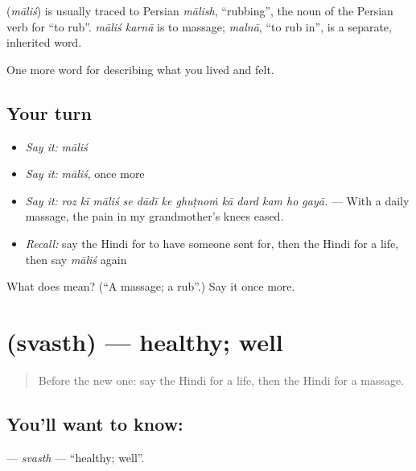 \begin{cousinweb}
\textbf{} (\emph{māliś}) is usually traced to Persian \emph{mālish}, \textquotedblleft{}rubbing\textquotedblright{}, the noun of the Persian verb for \textquotedblleft{}to rub\textquotedblright{}. \emph{māliś karnā} is to massage; \emph{malnā}, \textquotedblleft{}to rub in\textquotedblright{}, is a separate, inherited word.
\end{cousinweb}

\begin{grammarlens}[title={What you've built}]
One more word for describing what you lived and felt.
\end{grammarlens}

\subsection*{Your turn}
\begin{itemize}
\raggedright
  \item \emph{Say it:} \emph{māliś}
  \item \emph{Say it:} \emph{māliś}, once more
  \item \emph{Say it:} \emph{roz kī māliś se dādī ke ghuṭnoṁ kā dard kam ho gayā.} — With a daily massage, the pain in my grandmother's knees eased.
  \item \emph{Recall:} say the Hindi for to have someone sent for, then the Hindi for a life, then say \emph{māliś} again
\end{itemize}

\begin{tcolorbox}[breakable,colback=teal!4,colframe=teal!35!black,title={Before you move on}]
What does  mean? (\textquotedblleft{}A massage; a rub\textquotedblright{}.) Say it once more.
\end{tcolorbox}
\section[\texorpdfstring{\hi{स्वस्थ} (svasth)}{स्वस्थ (svasth)}]{ (svasth) — healthy; well}

\label{lesson:HI-C492-svasth}



\begin{quote}
Before the new one: say the Hindi for a life, then the Hindi for a massage.
\end{quote}

\subsection*{You'll want to know: }
\textbf{} — \emph{svasth} — \textquotedblleft{}healthy; well\textquotedblright{}.

